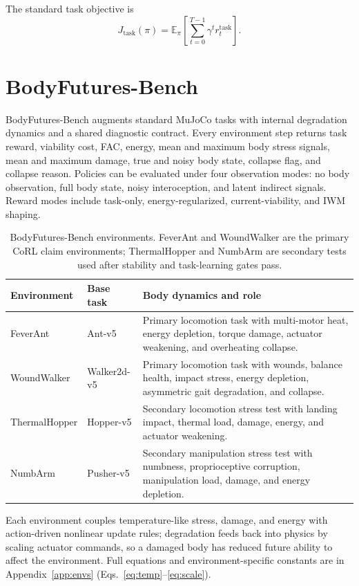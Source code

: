 \documentclass{article}
\newcommand{\task}{r^{\mathrm{task}}}
\newcommand{\E}{\mathbb{E}}
\begin{document}
The standard task objective is
\begin{equation}
    J_{\mathrm{task}}(\pi)
    =
    \E_{\pi}\left[\sum_{t=0}^{T-1}\gamma^t \task_t\right].
\end{equation}
\section{BodyFutures-Bench}
\label{sec:benchmark}

BodyFutures-Bench augments standard MuJoCo tasks with internal degradation dynamics and a shared diagnostic contract.  Every environment step returns task reward, viability cost, FAC, energy, mean and maximum body stress signals, mean and maximum damage, true and noisy body state, collapse flag, and collapse reason.  Policies can be evaluated under four observation modes: no body observation, full body state, noisy interoception, and latent indirect signals. Reward modes include task-only, energy-regularized, current-viability, and IWM shaping.

\begin{table}[t]
\centering
\small
\caption{BodyFutures-Bench environments.  FeverAnt and WoundWalker are the primary CoRL claim environments; ThermalHopper and NumbArm are secondary tests used after stability and task-learning gates pass.}
\label{tab:envs}
\begin{tabularx}{\linewidth}{llX}
\toprule
Environment & Base task & Body dynamics and role \\
\midrule
FeverAnt & Ant-v5 & Primary locomotion task with multi-motor heat,
energy depletion, torque damage, actuator weakening, and overheating collapse. \\
WoundWalker & Walker2d-v5 & Primary locomotion task with wounds, balance
health, impact stress, energy depletion, asymmetric gait degradation, and collapse. \\
ThermalHopper & Hopper-v5 & Secondary locomotion stress test with landing
impact, thermal load, damage, energy, and actuator weakening. \\
NumbArm & Pusher-v5 & Secondary manipulation stress test with numbness,
proprioceptive corruption, manipulation load, damage, and energy depletion. \\
\bottomrule
\end{tabularx}
\end{table}

Each environment couples temperature-like stress, damage, and energy with action-driven nonlinear update rules; degradation feeds back into physics by scaling actuator commands, so a damaged body has reduced future ability to affect the environment. Full equations and environment-specific constants are in Appendix~\ref{app:envs} (Eqs.~\ref{eq:temp}--\ref{eq:scale}).
\end{document}

